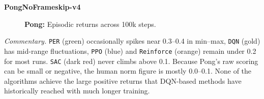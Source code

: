 \noindent
\textbf{PongNoFrameskip-v4}
\begin{figure}[htbp]
	\centering
	\quad
	\caption{\textbf{Pong:} Episodic returns across 100k steps.}
	\label{fig:pong_comparison_combined}
\end{figure}

\noindent
\emph{Commentary.}
\texttt{PER} (green) occasionally spikes near 0.3--0.4 in min--max, 
\texttt{DQN} (gold) has mid-range fluctuations, 
\texttt{PPO} (blue) and \texttt{Reinforce} (orange) remain under 0.2 for most runs. 
\texttt{SAC} (dark red) never climbs above 0.1. 
Because Pong’s raw scoring can be small or negative, 
the human norm figure is mostly 0.0--0.1. None of the algorithms achieve 
the large positive returns that DQN-based methods have historically 
reached with much longer training.

\bigskip

